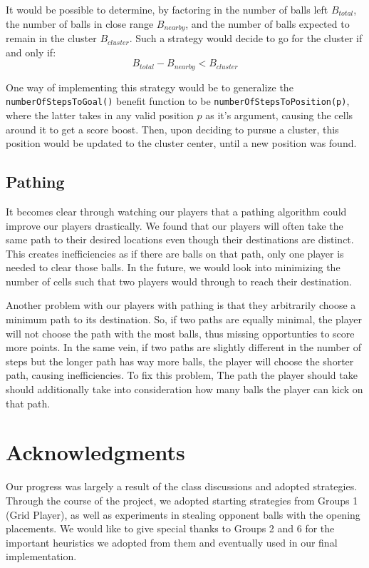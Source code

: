 \documentclass[
10pt, %
letterpaper, %
oneside, %
headinclude,footinclude, %
english
]{article}
\begin{document}
It would be possible to determine, by factoring in the number of balls left $B_{total}$, the number of balls in close range $B_{nearby}$, and the number of balls expected to remain in the cluster $B_{cluster}$. Such a strategy would decide to go for the cluster if and only if:
$$B_{total} - B_{nearby} < B_{cluster}$$

One way of implementing this strategy would be to generalize the  \texttt{numberOfStepsToGoal()} benefit function to be \texttt{numberOfStepsToPosition(p)}, where the latter takes in any valid position $p$ as it’s argument, causing the cells around it to get a score boost. Then, upon deciding to pursue a cluster, this position would be updated to the cluster center, until a new position was found.

\subsection{Pathing}
It becomes clear through watching our players that a pathing algorithm could improve our players drastically. We found that our players will often take the same path to their desired locations even though their destinations are distinct. This creates inefficiencies as if there are balls on that path, only one player is needed to clear those balls. In the future, we would look into minimizing the number of cells such that two players would through to reach their destination.

Another problem with our players with pathing is that they arbitrarily choose a minimum path to its destination. So, if two paths are equally minimal, the player will not choose the path with the most balls, thus missing opportunties to score more points. In the same vein, if two paths are slightly different in the number of steps but the longer path has way more balls, the player will choose the shorter path, causing inefficiencies. To fix this problem, The path the player should take should additionally take into consideration how many balls the player can kick on that path.

\section{Acknowledgments}

Our progress was largely a result of the class discussions and adopted strategies. Through the course of the project, we adopted starting strategies from Groups 1 (Grid Player), as well as experiments in stealing opponent balls with the opening placements. We would like to give special thanks to Groups 2 and 6 for the important heuristics we adopted from them and eventually used in our final implementation.
\end{document}
